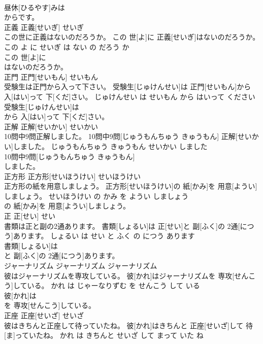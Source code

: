 \documentclass[8pt]{extreport}
\begin{document}
\begin{CJK}{UTF8}{min}
\\	昼休[ひるやす]みは
\\	からです。			
\\	正義	正義[せいぎ]	せいぎ	
\\	この世に正義はないのだろうか。	この 世[よ]に 正義[せいぎ]はないのだろうか。	この よ に せいぎ は ない の だろう か	
\\	この 世[よ]に
\\	はないのだろうか。			
\\	正門	正門[せいもん]	せいもん	
\\	受験生は正門から入って下さい。	受験生[じゅけんせい]は 正門[せいもん]から 入[はい]って 下[くだ]さい。	じゅけんせい は せいもん から はいって ください	
\\	受験生[じゅけんせい]は
\\	から 入[はい]って 下[くだ]さい。			
\\	正解	正解[せいかい]	せいかい	
\\	10問中9問正解しました。	10問中9問[じゅうもんちゅう きゅうもん] 正解[せいかい]しました。	じゅうもんちゅう きゅうもん せいかい しました	
\\	10問中9問[じゅうもんちゅう きゅうもん]
\\	しました。			
\\	正方形	正方形[せいほうけい]	せいほうけい	
\\	正方形の紙を用意しましょう。	正方形[せいほうけい]の 紙[かみ]を 用意[ようい]しましょう。	せいほうけい の かみ を ようい しましょう	
\\	の 紙[かみ]を 用意[ようい]しましょう。			
\\	正	正[せい]	せい	
\\	書類は正と副の2通あります。	書類[しょるい]は 正[せい]と 副[ふく]の 2通[につう]あります。	しょるい は せい と ふく の につう あります	
\\	書類[しょるい]は
\\	と 副[ふく]の 2通[につう]あります。			
\\	ジャーナリズム	ジャーナリズム	ジャーナリズム	
\\	彼はジャーナリズムを専攻している。	彼[かれ]はジャーナリズムを 専攻[せんこう]している。	かれ は じゃーなりずむ を せんこう して いる	
\\	彼[かれ]は
\\	を 専攻[せんこう]している。			
\\	正座	正座[せいざ]	せいざ	
\\	彼はきちんと正座して待っていたね。	彼[かれ]はきちんと 正座[せいざ]して 待[ま]っていたね。	かれ は きちんと せいざ して まって いた ね	

\end{CJK}
\end{document}

